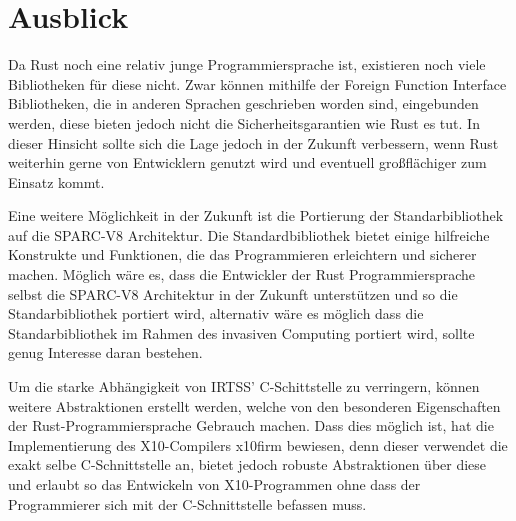 \section{Ausblick}

Da Rust noch eine relativ junge Programmiersprache ist, existieren noch viele Bibliotheken für diese nicht.
Zwar können mithilfe der Foreign Function Interface Bibliotheken,
die in anderen Sprachen geschrieben worden sind, eingebunden werden, diese bieten jedoch
nicht die Sicherheitsgarantien wie Rust es tut.
In dieser Hinsicht sollte sich die Lage jedoch in der Zukunft verbessern, wenn Rust
weiterhin gerne von Entwicklern genutzt wird und eventuell großflächiger zum Einsatz kommt.

Eine weitere Möglichkeit in der Zukunft ist die Portierung der Standarbibliothek auf die SPARC-V8 Architektur.
Die Standardbibliothek bietet einige hilfreiche Konstrukte und Funktionen,
die das Programmieren erleichtern und sicherer machen.
Möglich wäre es, dass die Entwickler der Rust Programmiersprache selbst die SPARC-V8 Architektur
in der Zukunft unterstützen und so die Standarbibliothek portiert wird, alternativ wäre es möglich dass die 
Standarbibliothek im Rahmen des invasiven Computing portiert wird, sollte genug Interesse daran bestehen.

Um die starke Abhängigkeit von IRTSS' C-Schittstelle zu verringern,
können weitere Abstraktionen erstellt werden, welche von den
besonderen Eigenschaften der Rust-Programmiersprache Gebrauch machen.
Dass dies möglich ist, hat die Implementierung des X10-Compilers x10firm bewiesen,
denn dieser verwendet die exakt selbe C-Schnittstelle an,
bietet jedoch robuste Abstraktionen über diese und erlaubt so
das Entwickeln von X10-Programmen ohne dass der Programmierer sich mit der C-Schnittstelle befassen muss.
